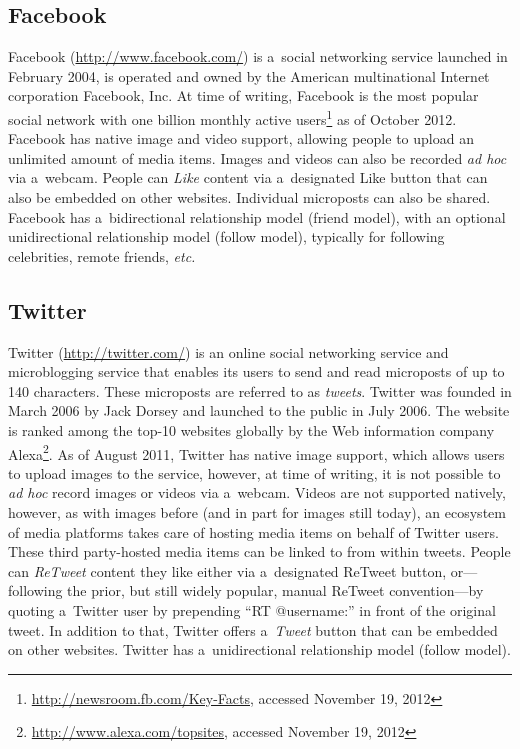 \subsection{Facebook}

Facebook (\url{http://www.facebook.com/})
is a~social networking service launched in February 2004,
is operated and owned by the American multinational
Internet corporation Facebook, Inc.
At time of writing, Facebook is the most popular social network
with one billion monthly active
users\footnote{\url{http://newsroom.fb.com/Key-Facts},
accessed November 19, 2012}
as of October 2012.
Facebook has native image and video support,
allowing people to upload an unlimited amount of media items.
Images and videos can also be recorded \emph{ad hoc} via a~webcam.
People can \emph{Like} content via a~designated Like button
that can also be embedded on other websites.
Individual microposts can also be shared.
Facebook has a~bidirectional relationship model (friend model),
with an optional unidirectional relationship model (follow model),
typically for following celebrities, remote friends, \emph{etc.}

\subsection{Twitter}

Twitter (\url{http://twitter.com/})
is an online social networking service
and microblogging service
that enables its users to send and read microposts
of up to 140 characters.
These microposts are referred to as \emph{tweets}.
Twitter was founded in March 2006 by Jack Dorsey
and launched to the public in July 2006.
The website is ranked among the top-10 websites globally
by the Web information company
Alexa\footnote{\url{http://www.alexa.com/topsites},
accessed November 19, 2012}.
As of August 2011, Twitter has native image support,
which allows users to upload images to the service, however,
at time of writing, it is not possible to \emph{ad hoc}
record images or videos via a~webcam.
Videos are not supported natively, however,
as with images before (and in part for images still today),
an ecosystem of media platforms takes care of
hosting media items on behalf of Twitter users.
These third party-hosted media items
can be linked to from within tweets.
People can \emph{ReTweet} content they like either
via a~designated ReTweet button,
or---following the prior, but still widely popular, manual ReTweet convention---by
quoting a~Twitter user by prepending ``RT @username:''
in front of the original tweet.
In addition to that, Twitter offers a~\emph{Tweet} button that can be embedded on other websites.
Twitter has a~unidirectional relationship model (follow model).

